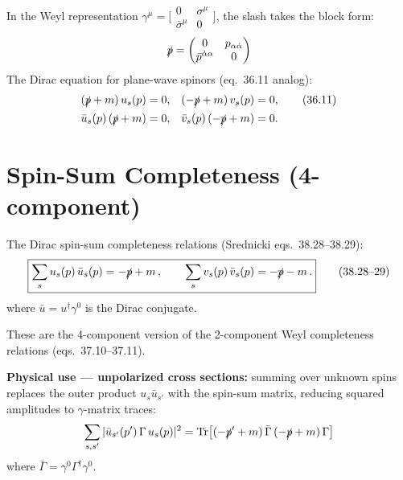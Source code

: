 In the Weyl representation $\gamma^\mu = \bigl[\begin{smallmatrix}0&\sigma^\mu\\\bar\sigma^\mu&0\end{smallmatrix}\bigr]$,
the slash takes the block form:
\begin{equation}
  \slashed{p} = \begin{pmatrix}0 & p_{\alpha\dot\alpha} \\ \bar p^{\dot\alpha\alpha} & 0\end{pmatrix}
\end{equation}
The Dirac equation for plane-wave spinors (eq.~36.11 analog):
\begin{align}
  (\slashed{p} + m)\,u_s(p) &= 0, & (-\slashed{p}+m)\,v_s(p) &= 0, \tag{36.11}\\
  \bar u_s(p)\,(\slashed{p}+m) &= 0, & \bar v_s(p)\,(-\slashed{p}+m) &= 0.
\end{align}


\section{Spin-Sum Completeness (4-component)}

The Dirac spin-sum completeness relations (Srednicki eqs.~38.28--38.29):
\begin{equation}
  \boxed{
    \sum_s u_s(p)\,\bar u_s(p) = -\slashed{p} + m\,,
    \qquad
    \sum_s v_s(p)\,\bar v_s(p) = -\slashed{p} - m\,.
  }
  \tag{38.28--29}
\end{equation}
where $\bar u = u^\dagger\gamma^0$ is the Dirac conjugate.

These are the 4-component version of the 2-component Weyl completeness relations
(eqs.~37.10--37.11).

\textbf{Physical use --- unpolarized cross sections:}  summing over unknown spins
replaces the outer product $u_s\bar u_{s'}$ with the spin-sum matrix, reducing
squared amplitudes to $\gamma$-matrix traces:
\begin{equation}
  \sum_{s,s'}|\bar u_{s'}(p')\,\Gamma\,u_s(p)|^2
  = \mathrm{Tr}\bigl[(-\slashed{p}'+m)\,\bar\Gamma\,(-\slashed{p}+m)\,\Gamma\bigr]
\end{equation}
where $\bar\Gamma = \gamma^0\Gamma^\dagger\gamma^0$.

